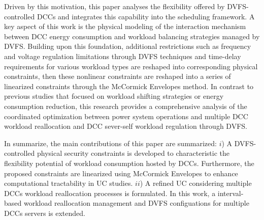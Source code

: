 \documentclass[lettersize,journal]{IEEEtran}
\begin{document}


Driven by this motivation, this paper analyses the flexibility offered by DVFS-controlled DCCs and integrates this capability into the scheduling framework. A key aspect of this work is the physical modeling of the interaction mechanism between DCC energy consumption and workload balancing strategies managed by DVFS. Building upon this foundation, additional restrictions such as frequency and voltage regulation limitations through DVFS techniques and time-delay requirements for various workload types are reshaped into corresponding physical constraints, then these nonlinear constraints are reshaped into a series of linearized constraints through the McCormick Envelopes method.
In contrast to previous studies that focused on workload shifting strategies or energy consumption reduction, this research provides a comprehensive analysis of the coordinated optimization between power system operations and multiple DCC workload reallocation and DCC sever-self workload regulation through DVFS.

In summarize, the main contributions of this paper are summarized:
$i$) A DVFS-controlled physical security constraints is developed to characteristic the flexibility potential of workload consumption hosted by DCCs. Furthermore, the proposed constraints are linearized using McCormick Envelopes to enhance computational tractability in UC studies.
$ii$) A refined UC considering multiple DCCs workload reallocation processes is formulated. In this work, a interval-based workload reallocation management and DVFS configuations for multiple DCCs servers is extended.
\end{document}
